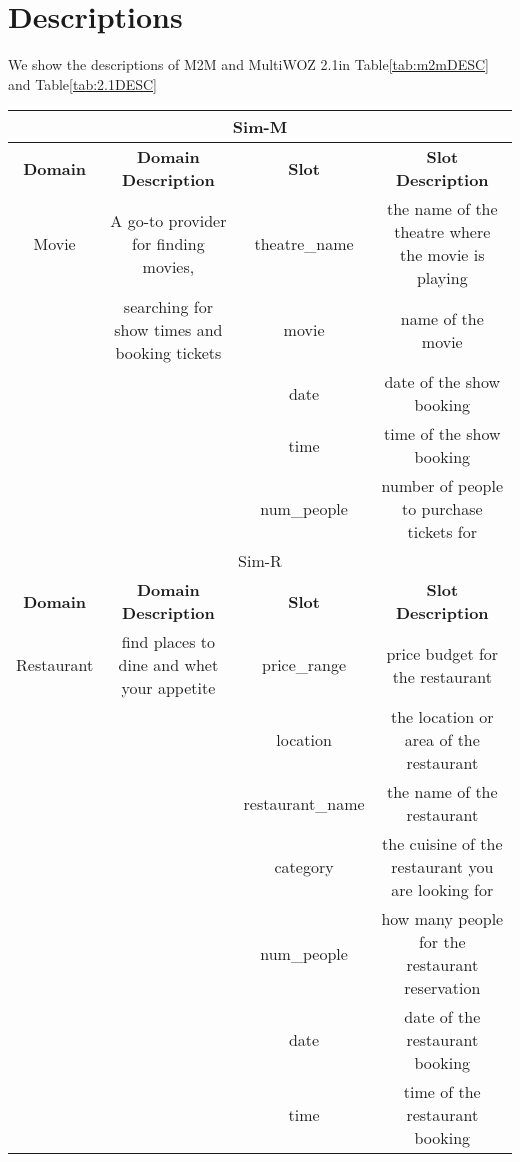 \documentclass[11pt]{article}
\begin{document}
\section{Descriptions}
We show the descriptions of  M2M and MultiWOZ 2.1in Table\ref{tab:m2mDESC} and Table\ref{tab:2.1DESC}
\label{sec:appendix}
\begin{table*}[t]
    \small
    \centering
    \caption{Domain and slot descriptions of M2M used in our experiments. The descriptions of the movie domain is taken from \cite{rastogi2020schema} and the descriptions of the restaurant domain is taken from \cite{zang2020multiwoz}.}
    \label{tab:m2mDESC}
    \begin{tabular}{cccc}
    \toprule
        \multicolumn{4}{c}{Sim-M}\\
        \midrule
        \textbf{Domain}  &  \textbf{Domain Description} & \textbf{Slot} & \textbf{Slot Description} \\
        \midrule
        Movie & A go-to provider for finding movies,  & theatre\_name  & the name of the theatre where the movie is playing \\
         & searching for show times and booking tickets  & movie  &  name of the movie  \\
         &  & date  & date of the show booking \\
         &  & time  & time of the show booking \\
         &  & num\_people & number of people to purchase tickets for \\
        \bottomrule
        \toprule
        \multicolumn{4}{c}{Sim-R}\\
        \midrule
         \textbf{Domain}   & \textbf{Domain Description} & \textbf{Slot}  & \textbf{Slot Description} \\
        Restaurant & find places to dine and whet your appetite & price\_range & price budget for the restaurant \\
        & & location & the location or area of the restaurant \\
        & & restaurant\_name & the name of the restaurant \\
        & & category & the cuisine of the restaurant you are looking for \\
        & & num\_people & how many people for the restaurant reservation\\
        & & date & date of the restaurant booking \\
        & & time & time of the restaurant booking \\
        \bottomrule
    \end{tabular}
\end{table*}
\end{document}
